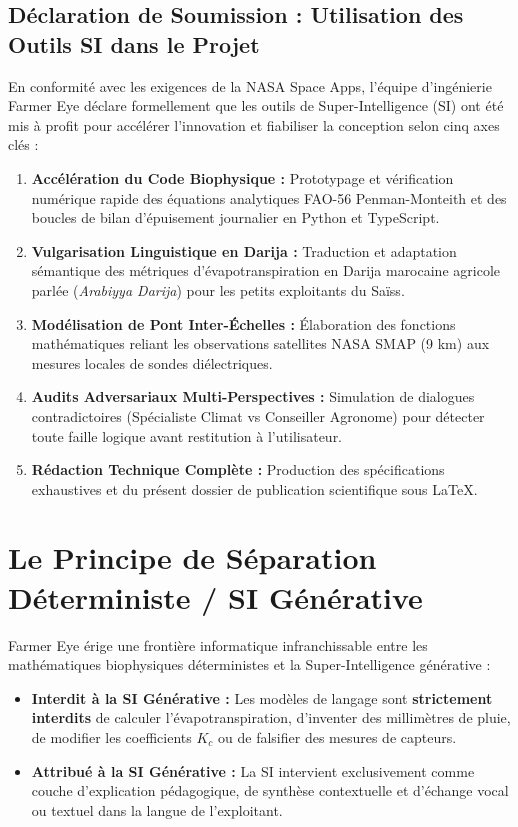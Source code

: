 \documentclass[11pt,a4paper,oneside]{report}
\begin{document}
\subsection{Déclaration de Soumission : Utilisation des Outils SI dans le Projet}
En conformité avec les exigences de la NASA Space Apps, l'équipe d'ingénierie Farmer Eye déclare formellement que les outils de Super-Intelligence (SI) ont été mis à profit pour accélérer l'innovation et fiabiliser la conception selon cinq axes clés :
\begin{enumerate}[leftmargin=*]
    \item \textbf{Accélération du Code Biophysique :} Prototypage et vérification numérique rapide des équations analytiques FAO-56 Penman-Monteith et des boucles de bilan d'épuisement journalier en Python et TypeScript.
    \item \textbf{Vulgarisation Linguistique en Darija :} Traduction et adaptation sémantique des métriques d'évapotranspiration en Darija marocaine agricole parlée (\textit{Arabiyya Darija}) pour les petits exploitants du Saïss.
    \item \textbf{Modélisation de Pont Inter-Échelles :} Élaboration des fonctions mathématiques reliant les observations satellites NASA SMAP (9 km) aux mesures locales de sondes diélectriques.
    \item \textbf{Audits Adversariaux Multi-Perspectives :} Simulation de dialogues contradictoires (Spécialiste Climat vs Conseiller Agronome) pour détecter toute faille logique avant restitution à l'utilisateur.
    \item \textbf{Rédaction Technique Complète :} Production des spécifications exhaustives et du présent dossier de publication scientifique sous LaTeX.
\end{enumerate}

\section{Le Principe de Séparation Déterministe / SI Générative}
Farmer Eye érige une frontière informatique infranchissable entre les mathématiques biophysiques déterministes et la Super-Intelligence générative :
\begin{itemize}[leftmargin=*]
    \item \textbf{Interdit à la SI Générative :} Les modèles de langage sont \textbf{strictement interdits} de calculer l'évapotranspiration, d'inventer des millimètres de pluie, de modifier les coefficients $K_c$ ou de falsifier des mesures de capteurs.
    \item \textbf{Attribué à la SI Générative :} La SI intervient exclusivement comme couche d'explication pédagogique, de synthèse contextuelle et d'échange vocal ou textuel dans la langue de l'exploitant.
\end{itemize}
\end{document}
